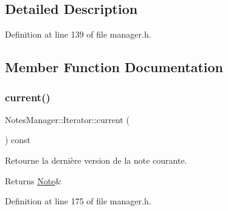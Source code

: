 \subsection{Detailed Description}


Definition at line 139 of file manager.\+h.



\subsection{Member Function Documentation}
\mbox{\label{class_notes_manager_1_1_iterator_a4fd73444f2edd5f196d7b950527f5a90}} 
\subsubsection{\texorpdfstring{current()}{current()}}
{\footnotesize\ttfamily Notes\+Manager\+::\+Iterator\+::current (\begin{DoxyParamCaption}{ }\end{DoxyParamCaption}) const\hspace{0.3cm}{\ttfamily [inline]}}



Retourne la dernière version de la note courante. 

\begin{DoxyReturn}{Returns}
\hyperlink{class_note}{Note}\& 
\end{DoxyReturn}


Definition at line 175 of file manager.\+h.


